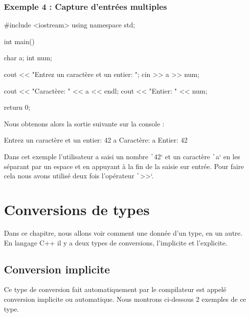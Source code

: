 \documentclass[10pt]{article}
\begin{document}
\subsubsection{Exemple 4 : Capture d'entrées multiples}
\begin{cppcode}
    #include <iostream>
    using namespace std;

    int main() {
        char a;
        int num;

        cout << "Entrez un caractère et un entier: ";
        cin >> a >> num;

        cout << "Caractère: " << a << endl;
        cout << "Entier: " << num;

        return 0;
    }
\end{cppcode}

\bigskip
Nous obtenons alors la sortie suivante sur la console :

\begin{textcode}
    Entrez un caractère et un entier: 42 a
    Caractère: a
    Entier: 42
\end{textcode}

Dans cet exemple l'utilisateur a saisi un nombre \texttt`42` et un caractère \texttt`a` en les séparant par un espace et en appuyant à la fin de la saisie sur entrée. Pour faire cela nous avons utilisé deux fois l'opérateur \texttt`>>`. 




\section{Conversions de types}

Dans ce chapitre, nous allons voir comment une donnée d'un type, en un autre. En langage C++ il y a deux types de conversions, l'implicite et l'explicite.

\subsection{Conversion implicite}
Ce type de conversion fait automatiquement par le compilateur est appelé conversion implicite ou automatique. Nous montrons ci-dessous
2 exemples de ce type.
\end{document}
